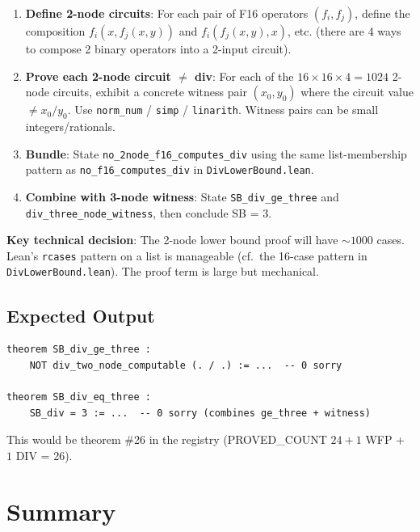 \documentclass[12pt]{article}
\theoremstyle{definition}
\begin{document}
\begin{enumerate}
  \item \textbf{Define 2-node circuits}: For each pair of F16 operators $(f_i, f_j)$,
    define the composition $f_i(x, f_j(x, y))$ and $f_i(f_j(x, y), x)$, etc.
    (there are 4 ways to compose 2 binary operators into a 2-input circuit).

  \item \textbf{Prove each 2-node circuit $\neq$ div}: For each of the
    $16 \times 16 \times 4 = 1024$ 2-node circuits, exhibit a concrete witness pair
    $(x_0, y_0)$ where the circuit value $\neq x_0/y_0$.
    Use \texttt{norm\_num} / \texttt{simp} / \texttt{linarith}.
    Witness pairs can be small integers/rationals.

  \item \textbf{Bundle}: State \texttt{no\_2node\_f16\_computes\_div} using
    the same list-membership pattern as \texttt{no\_f16\_computes\_div} in
    \texttt{DivLowerBound.lean}.

  \item \textbf{Combine with 3-node witness}: State \texttt{SB\_div\_ge\_three}
    and \texttt{div\_three\_node\_witness}, then conclude SB = 3.
\end{enumerate}

\textbf{Key technical decision}: The 2-node lower bound proof will have $\sim 1000$
cases. Lean's \texttt{rcases} pattern on a list is manageable (cf.\ the 16-case
pattern in \texttt{DivLowerBound.lean}). The proof term is large but mechanical.

\subsection{Expected Output}

\begin{verbatim}
theorem SB_div_ge_three :
    NOT div_two_node_computable (. / .) := ...  -- 0 sorry

theorem SB_div_eq_three :
    SB_div = 3 := ...  -- 0 sorry (combines ge_three + witness)
\end{verbatim}

This would be theorem \#26 in the registry (PROVED\_COUNT $24 + 1$ WFP + $1$ DIV = 26).

\section{Summary}
\end{document}
